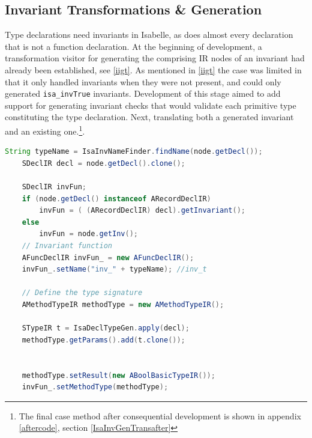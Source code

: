 	\subsection{Invariant Transformations \& Generation}
	Type declarations need invariants in Isabelle, as does almost every declaration that is not a function declaration. At the beginning of development, a transformation visitor for generating the comprising IR nodes of an invariant had already been established, see \ref{iigt}. As mentioned in \ref{iigt} the case was limited in that it only handled invariants when they were not present, and could only generated \lstinline[language=Java]{isa_invTrue} invariants. Development of this stage aimed to add support for generating invariant checks that would validate each primitive type constituting the type declaration. Next, translating both a generated invariant and an existing one.\footnote{The final case method after consequential development is shown in appendix \ref{aftercode}, section \ref{IsaInvGenTransafter}}. 

	\begin{lstlisting}[language=Java]
	String typeName = IsaInvNameFinder.findName(node.getDecl());
    SDeclIR decl = node.getDecl().clone();
     
    SDeclIR invFun;
    if (node.getDecl() instanceof ARecordDeclIR)
    	invFun = ( (ARecordDeclIR) decl).getInvariant();
    else
    	invFun = node.getInv();
    // Invariant function
    AFuncDeclIR invFun_ = new AFuncDeclIR();
    invFun_.setName("inv_" + typeName); //inv_t

    // Define the type signature
    AMethodTypeIR methodType = new AMethodTypeIR();
    
    STypeIR t = IsaDeclTypeGen.apply(decl);
    methodType.getParams().add(t.clone());
    
        
	methodType.setResult(new ABoolBasicTypeIR());
    invFun_.setMethodType(methodType);
	\end{lstlisting}  
	
